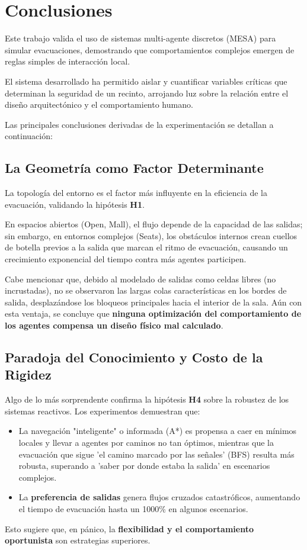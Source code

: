 \documentclass[11pt,spanish,listoffigures,listoftables]{tfgetsinf}
\begin{document}
\section{Conclusiones}

Este trabajo valida el uso de sistemas multi-agente discretos (MESA) para simular evacuaciones, demostrando que comportamientos complejos emergen de reglas simples de interacción local. 

El sistema desarrollado ha permitido aislar y cuantificar variables críticas que determinan la seguridad de un recinto, arrojando luz sobre la relación entre el diseño arquitectónico y el comportamiento humano.

Las principales conclusiones derivadas de la experimentación se detallan a continuación:

\subsection{La Geometría como Factor Determinante}
La topología del entorno es el factor más influyente en la eficiencia de la evacuación, validando la hipótesis \textbf{H1}. 

En espacios abiertos (Open, Mall), el flujo depende de la capacidad de las salidas; sin embargo, en entornos complejos (Seats), los obstáculos internos crean cuellos de botella previos a la salida que marcan el ritmo de evacuación, causando un crecimiento exponencial del tiempo contra más agentes participen. 

Cabe mencionar que, debido al modelado de salidas como celdas libres (no incrustadas), no se observaron las largas colas características en los bordes de salida, desplazándose los bloqueos principales hacia el interior de la sala. Aún con esta ventaja, se concluye que \textbf{ninguna optimización del comportamiento de los agentes compensa un diseño físico mal calculado}.

\subsection{Paradoja del Conocimiento y Costo de la Rigidez}
Algo de lo más sorprendente confirma la hipótesis \textbf{H4} sobre la robustez de los sistemas reactivos. Los experimentos demuestran que:
\begin{itemize}
    \item La navegación "inteligente" o informada (A*) es propensa a caer en mínimos locales y llevar a agentes por caminos no tan óptimos, mientras que la evacuación que sigue 'el camino marcado por las señales' (BFS) resulta más robusta, superando a 'saber por donde estaba la salida' en escenarios complejos.
    \item La \textbf{preferencia de salidas} genera flujos cruzados catastróficos, aumentando el tiempo de evacuación hasta un 1000\% en algunos escenarios. 
\end{itemize}
Esto sugiere que, en pánico, la \textbf{flexibilidad y el comportamiento oportunista} son estrategias superiores.
\end{document}
